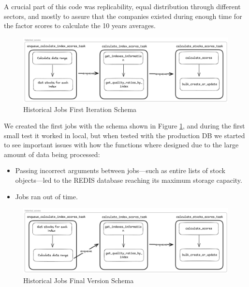 \documentclass[11pt,english,a4paper,hidelinks]{book}
\begin{document}
\vspace{0.5cm}
\noindent A crucial part of this code was replicability, equal distribution through different sectors, and mostly to assure that the companies existed during enough time for the factor scores to calculate the 10 years averages.
\begin{figure}[H]
    \centering
    \includegraphics[width=1\textwidth]{images/tweenvest/Historical Jobs First Iteration.png}
    \caption{Historical Jobs First Iteration Schema}
    \label{fig:historical_jobs_first_iteration}
\end{figure}

\noindent We created the first jobs with the schema shown in Figure \ref{fig:historical_jobs_first_iteration}, and during the first small test it worked in local, but when tested with the production DB we started to see important issues with how the functions where designed due to the large amount of data being processed:
\begin{itemize}
    \item Passing incorrect arguments between jobs—such as entire lists of stock objects—led to the REDIS database reaching its maximum storage capacity.
    \item Jobs ran out of time.
\end{itemize}

\begin{figure}[H]
    \centering
    \includegraphics[width=1\textwidth]{images/tweenvest/Historical Jobs Final Version.png}
    \caption{Historical Jobs Final Version Schema}
    \label{fig:historical_jobs_final_version}
\end{figure}
\end{document}

